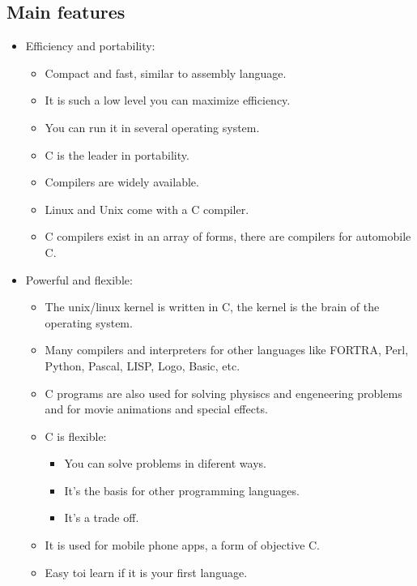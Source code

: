 \subsection{Main features}
\begin{itemize}
    \item Efficiency and portability:
        \begin{itemize}
            \item Compact and fast, similar to assembly language.
            \item It is such a low level you can maximize efficiency.
            \item You can run it in several operating system.
            \item C is the leader in portability.
            \item Compilers are widely available.
            \item Linux and Unix come with a C compiler.
            \item C compilers exist in an array of forms, there are compilers for automobile C.
            
        \end{itemize}
    
    \item Powerful and flexible: 
        \begin{itemize}
            \item The unix/linux kernel is written in C, the kernel is the brain of the operating system.
            \item Many compilers and interpreters for other languages like FORTRA, Perl, Python, Pascal, LISP, Logo, Basic, etc.
            \item C programs are also used for solving physiscs and engeneering problems and for movie animations and special effects.
            \item C is flexible:
                \begin{itemize}
                    \item You can solve problems in diferent ways.
                    \item It's the basis for other programming languages.
                    \item It's a trade off. 
                \end{itemize}
            
            \item It is used for mobile phone apps, a form of objective C.
            \item Easy toi learn if it is your first language.
        \end{itemize}


\end{itemize}
